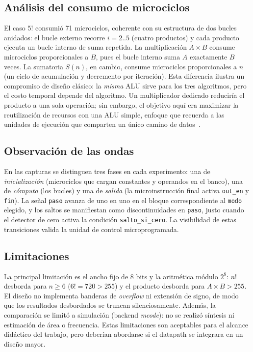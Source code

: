 \documentclass[llncs]{llncs}
\begin{document}
\subsection{Análisis del consumo de microciclos}

El caso $5!$ consumió 71 microciclos, coherente con su estructura de dos
bucles anidados: el bucle externo recorre $i=2..5$ (cuatro productos) y cada
producto ejecuta un bucle interno de suma repetida. La multiplicación
$A\times B$ consume microciclos proporcionales a $B$, pues el bucle interno
suma $A$ exactamente $B$ veces. La sumatoria $S(n)$, en cambio, consume
microciclos proporcionales a $n$ (un ciclo de acumulación y decremento por
iteración). Esta diferencia ilustra un compromiso de diseño clásico: la
\emph{misma} ALU sirve para los tres algoritmos, pero el costo temporal depende
del algoritmo. Un multiplicador dedicado reduciría el producto a una sola
operación; sin embargo, el objetivo aquí era maximizar la reutilización de
recursos con una ALU simple, enfoque que recuerda a las unidades de ejecución
que comparten un único camino de
datos~\cite{anderson1967fp,tjaden1970}.

\subsection{Observación de las ondas}

En las capturas se distinguen tres fases en cada experimento: una de
\emph{inicialización} (microciclos que cargan constantes y operandos en el
banco), una de \emph{cómputo} (los bucles) y una de \emph{salida} (la
microinstrucción final activa \texttt{out\_en} y \texttt{fin}). La señal
\texttt{paso} avanza de uno en uno en el bloque correspondiente al
\texttt{modo} elegido, y los saltos se manifiestan como discontinuidades en
\texttt{paso}, justo cuando el detector de cero activa la condición
\texttt{salto\_si\_cero}. La visibilidad de estas transiciones valida la
unidad de control microprogramada.

\subsection{Limitaciones}

La principal limitación es el ancho fijo de 8 bits y la aritmética módulo
$2^8$: $n!$ desborda para $n\ge6$ ($6!=720>255$) y el producto desborda para
$A\times B>255$. El diseño no implementa banderas de \emph{overflow} ni
extensión de signo, de modo que los resultados desbordados se truncan
silenciosamente. Además, la comparación se limitó a simulación (backend
\emph{mcode}): no se realizó síntesis ni estimación de área o frecuencia. Estas
limitaciones son aceptables para el alcance didáctico del trabajo, pero
deberían abordarse si el datapath se integrara en un diseño mayor.
\end{document}
